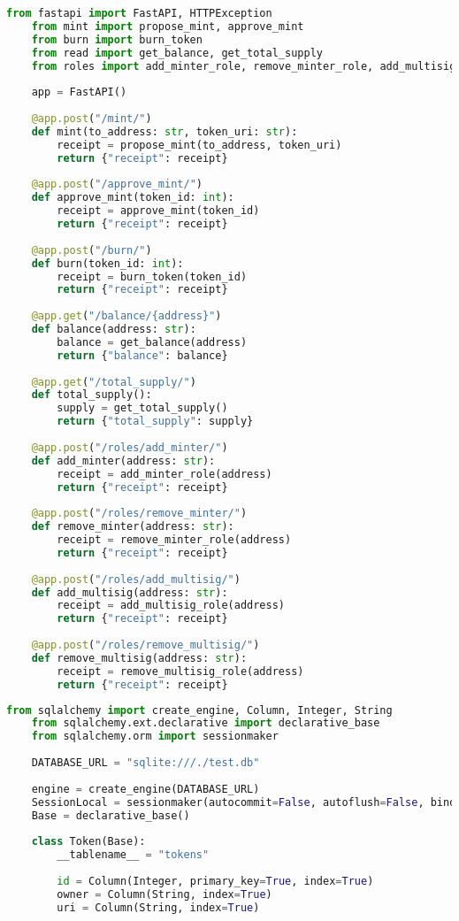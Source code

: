 \begin{lstlisting}[language=Python, caption=Ядро API]
    from fastapi import FastAPI, HTTPException
    from mint import propose_mint, approve_mint
    from burn import burn_token
    from read import get_balance, get_total_supply
    from roles import add_minter_role, remove_minter_role, add_multisig_role, remove_multisig_role
    
    app = FastAPI()
    
    @app.post("/mint/")
    def mint(to_address: str, token_uri: str):
        receipt = propose_mint(to_address, token_uri)
        return {"receipt": receipt}
    
    @app.post("/approve_mint/")
    def approve_mint(token_id: int):
        receipt = approve_mint(token_id)
        return {"receipt": receipt}
    
    @app.post("/burn/")
    def burn(token_id: int):
        receipt = burn_token(token_id)
        return {"receipt": receipt}
    
    @app.get("/balance/{address}")
    def balance(address: str):
        balance = get_balance(address)
        return {"balance": balance}
    
    @app.get("/total_supply/")
    def total_supply():
        supply = get_total_supply()
        return {"total_supply": supply}
    
    @app.post("/roles/add_minter/")
    def add_minter(address: str):
        receipt = add_minter_role(address)
        return {"receipt": receipt}
    
    @app.post("/roles/remove_minter/")
    def remove_minter(address: str):
        receipt = remove_minter_role(address)
        return {"receipt": receipt}
    
    @app.post("/roles/add_multisig/")
    def add_multisig(address: str):
        receipt = add_multisig_role(address)
        return {"receipt": receipt}
    
    @app.post("/roles/remove_multisig/")
    def remove_multisig(address: str):
        receipt = remove_multisig_role(address)
        return {"receipt": receipt}
\end{lstlisting}

\begin{lstlisting}[language=Python, caption=Упрощенная модель для базы данных]
    from sqlalchemy import create_engine, Column, Integer, String
    from sqlalchemy.ext.declarative import declarative_base
    from sqlalchemy.orm import sessionmaker
    
    DATABASE_URL = "sqlite:///./test.db"
    
    engine = create_engine(DATABASE_URL)
    SessionLocal = sessionmaker(autocommit=False, autoflush=False, bind=engine)
    Base = declarative_base()
    
    class Token(Base):
        __tablename__ = "tokens"
    
        id = Column(Integer, primary_key=True, index=True)
        owner = Column(String, index=True)
        uri = Column(String, index=True)    
\end{lstlisting}

